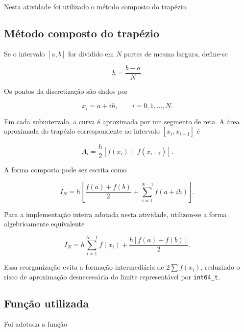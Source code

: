 Nesta atividade foi utilizado o método composto do trapézio.

\subsection{Método composto do trapézio}

Se o intervalo \([a,b]\) for dividido em \(N\) partes de mesma largura,
define-se

\begin{equation}
    h = \frac{b-a}{N}.
\end{equation}

Os pontos da discretização são dados por

\begin{equation}
    x_i = a + ih,
    \qquad
    i = 0,1,\ldots,N.
\end{equation}

Em cada subintervalo, a curva é aproximada por um segmento de reta. A área
aproximada do trapézio correspondente ao intervalo
\([x_i,x_{i+1}]\) é

\begin{equation}
    A_i =
    \frac{h}{2}
    \left[
        f(x_i)+f(x_{i+1})
    \right].
\end{equation}

A forma composta pode ser escrita como

\begin{equation}
    I_N =
    h
    \left[
        \frac{f(a)+f(b)}{2}
        +
        \sum_{i=1}^{N-1} f(a+ih)
    \right].
\end{equation}

Para a implementação inteira adotada nesta atividade, utilizou-se a forma
algebricamente equivalente

\begin{equation}
    I_N =
    h
    \sum_{i=1}^{N-1} f(x_i)
    +
    \frac{
        h\left[f(a)+f(b)\right]
    }{2}.
    \label{eq:atvd04-trapezio}
\end{equation}

Essa reorganização evita a formação intermediária de
\(2\sum f(x_i)\), reduzindo o risco de aproximação desnecessária do limite
representável por \texttt{int64\_t}.

\subsection{Função utilizada}

Foi adotada a função


